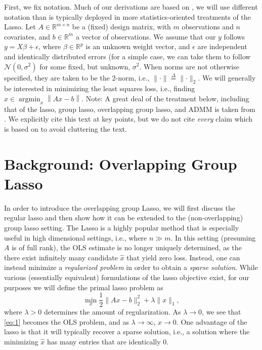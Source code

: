 \documentclass{article}
\begin{document}
First, we fix notation.
Much of our derivations are based on \cite{boyd_distributed_2011}, we will use different notation than is typically deployed in more statistics-oriented treatments of the Lasso.
Let $A \in \mathbb{R}^{m \times n}$ be a (fixed) design matrix, with $m$ observations and $n$ covariates, and $b \in \mathbb{R}^m$ a vector of observations.
We assume that our $y$ follows $y = X \beta + \epsilon$, where $\beta \in \mathbb{R}^p$ is an unknown weight vector, and $\epsilon$ are independent and identically distributed errors (for a simple case, we can take them to follow $\mathcal{N}(0,\sigma^2)$ for some fixed, but unknown, $\sigma^2$.
When norms are not otherwise specified, they are taken to be the 2-norm, i.e., $\lVert \cdot \rVert \overset{\Delta}{=} \lVert \cdot \rVert_2$.
We will generally be interested in minimizing the least squares loss, i.e., finding $\hat{x} \in \operatorname{argmin}_x \left\| Ax - b \right\|$.
Note: A great deal of the treatment below, including that of the lasso, group lasso, overlapping group lasso, and ADMM is taken from \cite{boyd_distributed_2011}.
We explicitly cite this text at key points, but we do not cite \emph{every} claim which is based on \cite{boyd_distributed_2011} to avoid cluttering the text.

\section{Background: Overlapping Group Lasso}
\label{sec:backgr-group-lasso}
In order to introduce the overlapping group Lasso, we will first discuss the regular lasso and then show how it can be extended to the (non-overlapping) group lasso setting.
The Lasso is a highly popular method that is especially useful in high dimensional settings, i.e., where $n \gg m$.
In this setting (presuming $A$ is of full rank), the OLS estimate is no longer uniquely determined, as the there exist infinitely many candidate $\hat{x}$ that yield zero loss.
Instead, one can instead minimize a \emph{regularized problem} in order to obtain a \emph{sparse solution}.
While various (essentially equivalent) formulations of the lasso objective exist, for our purposes we will define the primal lasso problem as
\begin{equation}
  \label{eq:1}
  \operatorname*{min}_x \frac{1}{2} \lVert Ax - b \rVert_2^2 + \lambda \lVert x \rVert_1,
\end{equation}
where $\lambda > 0$ determines the amount of regularization.
As $\lambda \to 0$, we see that \eqref{eq:1} becomes the OLS problem, and as $\lambda \to \infty$, $x \to 0$.
One advantage of the lasso is that it will typically recover a sparse solution, i.e., a solution where the minimizing $\hat{x}$ has many entries that are identically 0.
\end{document}
